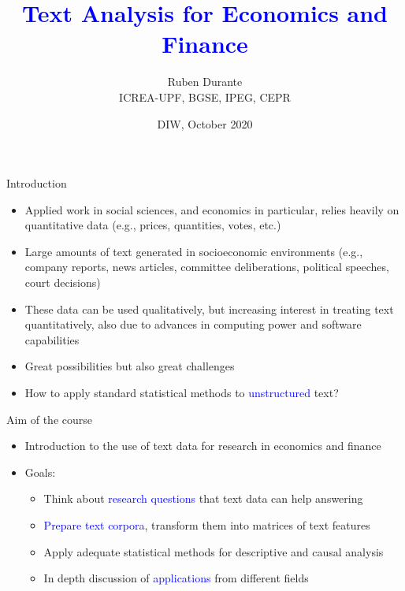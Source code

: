 \documentclass[english]{beamer}
\begin{document}
\title{\textcolor{blue}{Text Analysis for Economics and Finance}}
\vspace{8pt} 
\author{Ruben Durante\\
\small{ICREA-UPF, BGSE, IPEG, CEPR}}
\date{\small{DIW, October 2020}}

\frame{\titlepage}

\begin{frame}{Introduction}

\begin{itemize}
\setlength{\itemsep}{0.9em}
\item Applied work in social sciences, and economics in particular, relies heavily on quantitative
data (e.g., prices, quantities, votes, etc.)

\item Large amounts of text generated in socioeconomic environments (e.g., company reports, news articles, committee deliberations, political speeches, court decisions)

\item These data can be used qualitatively, but increasing interest in treating text quantitatively, also due to advances in computing power and software capabilities

\item Great possibilities but also great challenges

\pause

\item How to apply standard statistical methods to \textcolor{blue}{unstructured} text?

\end{itemize}
\end{frame}


\begin{frame}{Aim of the course}

\begin{itemize}
    \item Introduction to the use of text data for research in economics and finance
\vspace{10pt}
    \item Goals:
\vspace{8pt}
\begin{itemize}
\setlength{\itemsep}{0.9em}
\setlength{\itemindent}{-0.8em}

    \item Think about \textcolor{blue}{research questions} that text data can help answering
    \item \textcolor{blue}{Prepare text corpora}, transform them into matrices of text features
    \item Apply adequate statistical methods for descriptive and causal analysis
    \item In depth discussion of \textcolor{blue}{applications} from different fields
    
\end{itemize}

\end{itemize}
\end{frame}
\end{document}
